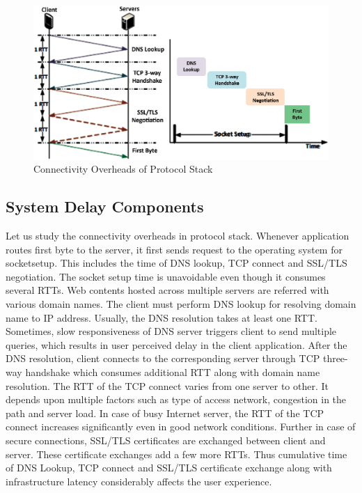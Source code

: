 \begin{multicols}{2}
\begin{figure}[H]
\centering
\includegraphics[scale=.9]{src/Figures/chap1/chap1-fig04.jpg}
\caption{Connectivity Overheads of Protocol Stack}\label{chap1-fig04}
\end{figure}

\subsection{System Delay Components}

Let us study the connectivity overheads in protocol stack. Whenever application routes first byte to the server, it first sends request to the operating system for socketsetup. This includes the time of DNS lookup, TCP connect and SSL/TLS negotiation. The socket setup time is unavoidable even though it consumes several RTTs. Web contents hosted across multiple servers are referred with various domain names. The client must perform DNS lookup for resolving domain name to IP address. Usually, the DNS resolution takes at least one RTT. Sometimes, slow responsiveness of DNS server triggers client to send multiple queries, which results in user perceived delay in the client application. After the DNS resolution, client connects to the corresponding server through TCP three-way handshake which consumes additional RTT along with domain name resolution. The RTT of the TCP connect varies from one server to other. It depends upon multiple factors such as type of access network, congestion in the path and server load. In case of busy Internet server, the RTT of the TCP connect increases significantly even in good network conditions. Further in case of secure connections, SSL/TLS certificates are exchanged between client and server. These certificate exchanges add a few more RTTs. Thus cumulative time of DNS Lookup, TCP connect and SSL/TLS certificate exchange along with infrastructure latency considerably affects the user experience.


\end{multicols}

